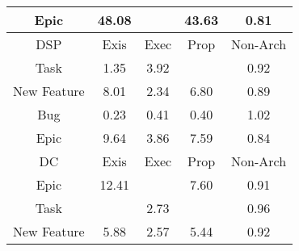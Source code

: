 \begin{tabular}{|c||c|c|c|c|}
\hline
Epic & \cellcolor[rgb]{0.53,0.66,0.42} 48.08 &  & \cellcolor[rgb]{0.5659111079394233,0.6770105248134112,0.42} 43.63 & \cellcolor[rgb]{0.8782935304749442,0.6899227109147356,0.39040729510994787} 0.81 \\ 
\hline
\hline
DSP & Exis & Exec & Prop & Non-Arch \\ 
\hline
Task & \cellcolor[rgb]{0.9071361945130673,0.8386434605588212,0.42} 1.35 & \cellcolor[rgb]{0.8863940209289729,0.8288182204400397,0.42} 3.92 &  & \cellcolor[rgb]{0.8969260257355851,0.7781165218151025,0.40779762401987935} 0.92 \\ 
\hline
New Feature & \cellcolor[rgb]{0.8534417892832693,0.8132092686078644,0.42} 8.01 & \cellcolor[rgb]{0.8991889919050078,0.83487899616553,0.42} 2.34 & \cellcolor[rgb]{0.8631466184721582,0.8178062929604959,0.42} 6.80 & \cellcolor[rgb]{0.8914445787440549,0.7521710060551932,0.40268160682778453} 0.89 \\ 
\hline
Bug & \cellcolor[rgb]{0.7795757364981983,0.22265848609147187,0.2982706873983184} 0.23 & \cellcolor[rgb]{0.8094750089133469,0.3641817088565087,0.32617667498579045} 0.41 & \cellcolor[rgb]{0.8087672433522279,0.3608316185338786,0.3255160937954127} 0.40 & \cellcolor[rgb]{0.9098116689067594,0.8399107905347807,0.42} 1.02 \\ 
\hline
Epic & \cellcolor[rgb]{0.840282003892988,0.8069756860545733,0.42} 9.64 & \cellcolor[rgb]{0.8869084479509817,0.8290618963978333,0.42} 3.86 & \cellcolor[rgb]{0.8568386569697367,0.8148183111961911,0.42} 7.59 & \cellcolor[rgb]{0.8823521560579045,0.7091335386740815,0.39419534565404424} 0.84 \\ 
\hline
\hline
DC & Exis & Exec & Prop & Non-Arch \\ 
\hline
Epic & \cellcolor[rgb]{0.8178998431547693,0.7963736099154171,0.42000000000000004} 12.41 &  & \cellcolor[rgb]{0.8567430340424214,0.8147730161253575,0.42} 7.60 & \cellcolor[rgb]{0.8948998162864931,0.7685257970894,0.4059064952007268} 0.91 \\ 
\hline
Task &  & \cellcolor[rgb]{0.8960691091413071,0.8334011569616717,0.42} 2.73 &  & \cellcolor[rgb]{0.9033064668874479,0.8083172766005862,0.4137527024282846} 0.96 \\ 
\hline
New Feature & \cellcolor[rgb]{0.8706437736510508,0.8213575769926029,0.42} 5.88 & \cellcolor[rgb]{0.8973250557045942,0.8339960790179657,0.42} 2.57 & \cellcolor[rgb]{0.8741624071773971,0.8230242981366618,0.42} 5.44 & \cellcolor[rgb]{0.8971791407622741,0.7793145996080971,0.40803386471145575} 0.92 \\ 

\end{tabular}
